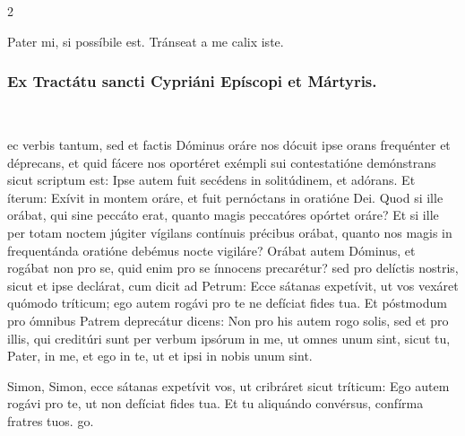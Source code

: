\documentclass[9pt,twoside]{extarticle}
\begin{document}
\begin{multicols}{2}
\begin{tightlist}{}
\item {} Pater mi, si possíbile est.  Tránseat a me calix iste.
\end{tightlist}

\subsubsection*{\center Ex Tractátu sancti Cypriáni Epíscopi et Mártyris.}
\begin{center}\\
\end{center}
ec verbis tantum, sed et factis Dóminus oráre nos dócuit ipse orans frequénter et déprecans, et quid fácere nos oportéret exémpli sui contestatióne demónstrans sicut scriptum est: Ipse autem fuit secédens in solitúdinem, et adórans. Et íterum: Exívit in montem oráre, et fuit pernóctans in oratióne Dei. Quod si ille orábat, qui sine peccáto erat, quanto magis peccatóres opórtet oráre? Et si ille per totam noctem júgiter vígilans contínuis précibus orábat, quanto nos magis in frequentánda oratióne debémus nocte vigiláre? Orábat autem Dóminus, et rogábat non pro se, quid enim pro se ínnocens precarétur? sed pro delíctis nostris, sicut et ipse declárat, cum dicit ad Petrum: Ecce sátanas expetívit, ut vos vexáret quómodo tríticum; ego autem rogávi pro te ne defíciat fides tua. Et póstmodum pro ómnibus Patrem deprecátur dicens: Non pro his autem rogo solis, sed et pro illis, qui creditúri sunt per verbum ipsórum in me, ut omnes unum sint, sicut tu, Pater, in me, et ego in te, ut et ipsi in nobis unum sint.

\begin{tightlist}{}
\item {} Simon, Simon, ecce sátanas expetívit vos, ut cribráret sicut tríticum: \textred{*} Ego autem rogávi pro te, ut non defíciat fides tua.  Et tu aliquándo convérsus, confírma fratres tuos. go.
\end{tightlist}


\end{multicols}
\end{document}

